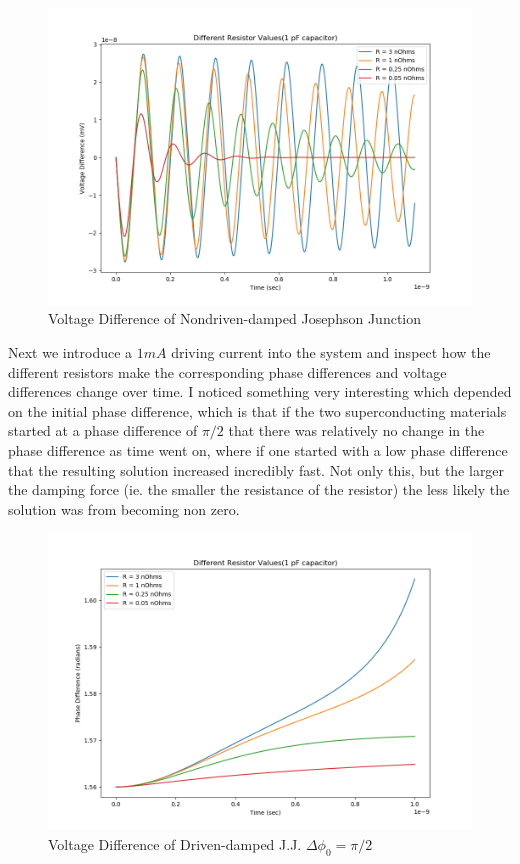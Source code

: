\documentclass[12pt]{article}
\begin{document}
\begin{figure}
\caption{Voltage Difference of Nondriven-damped Josephson Junction}
\begin{center}
\includegraphics[scale=0.50]{dud-jjresv.png}
\end{center}
\end{figure}

Next we introduce a $1 mA$ driving current into the system and inspect how the different resistors make the corresponding phase differences and voltage differences change over time.  I noticed something very interesting which depended on the initial phase difference, which is that if the two superconducting materials started at a phase difference of $\pi / 2$ that there was relatively no change in the phase difference as time went on, where if one started with a low phase difference that the resulting solution increased incredibly fast.  Not only this, but the larger the damping force (ie. the smaller the resistance of the resistor) the less likely the solution was from becoming non zero.

\begin{figure}
\caption{Voltage Difference of Driven-damped J.J. $\Delta \phi_0 = \pi / 2$}
\begin{center}
\includegraphics[scale=0.50]{dd-jjres.png}
\end{center}
\end{figure}
\end{document}
